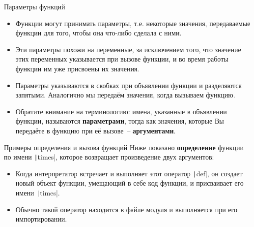 \documentclass[aspectratio=169]{beamer}%
\begin{document}
\begin{frame}[fragile]{Параметры функций}
\scriptsize
\begin{itemize}
\item Функции могут принимать параметры, т.е. некоторые значения, передаваемые функции для того, чтобы она что-либо сделала с ними. 
\item Эти параметры похожи на переменные, за исключением того, что значение этих переменных указывается при вызове функции, и во время работы функции им уже присвоены их значения.

\item Параметры указываются в скобках при объявлении функции и разделяются запятыми. Аналогично мы передаём значения, когда вызываем функцию. 
\item Обратите внимание на терминологию: имена, указанные в объявлении функции, называются \textcolor{extraorange}{\textbf{параметрами}}, тогда как значения, которые Вы передаёте в функцию при её вызове~-- \textcolor{extraorange}{\textbf{аргументами}}.
\end{itemize}
\vfill
\end{frame}


\begin{frame}[fragile]{Примеры определения и вызова функций}
\scriptsize
Ниже показано \textcolor{extraorange}{\textbf{определение}} функции по имени \texttt|times|, которое возвращает произведение двух аргументов:
\begin{itemize}
\begin{verbatim}
>>> def times(x, y):
...    return x * y
\end{verbatim}

\item Когда интерпретатор встречает и выполняет этот оператор \texttt|def|, он создает новый объект функции, умещающий в себе код функции, и присваивает его имени \texttt|times|. 
\item Обычно такой оператор находится в файле модуля и выполняется при его импортировании.
\end{itemize}
\vfill
\end{frame}
\end{document}
